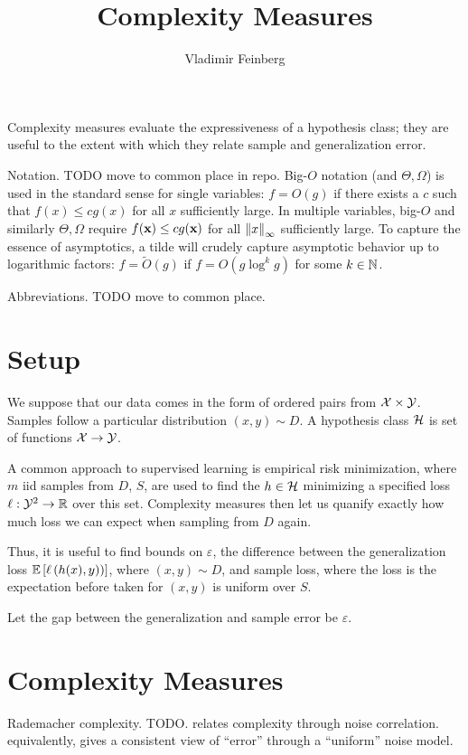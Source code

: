 \documentclass{article}
\title{Complexity Measures}
\author{Vladimir Feinberg}
\begin{document}
\maketitle

Complexity measures evaluate the expressiveness of a hypothesis class; they are useful to the extent with which they relate sample and generalization error.

Notation. TODO move to common place in repo. Big-$O$ notation (and $\Theta,\Omega$) is used in the standard sense for single variables: $f=O(g)$ if there exists a $c$ such that $f(x)\le cg(x)$ for all $x$ sufficiently large. In multiple variables, big-$O$ and similarly $\Theta,\Omega$ require $f(\textbf{x})\le cg(\textbf{x})$ for all $\left\| x \right\|_\infty$ sufficiently large. To capture the essence of asymptotics, a tilde will crudely capture asymptotic behavior up to logarithmic factors: $f=\tilde{O}(g)$ if $f=O(g\log^k g)$ for some $k\in\mathbb{N}$.

Abbreviations. TODO move to common place.

\section{Setup}

We suppose that our data comes in the form of ordered pairs from $\mathcal{X}\times \mathcal{Y}$. Samples follow a particular distribution $(x, y)\sim D$. A hypothesis class ${\mathcal{H}}$ is set of functions $\mathcal{X}\rightarrow\mathcal{Y}$.

A common approach to supervised learning is empirical risk minimization, where $m$ iid samples from $D$, $S$, are used to find the $h\in{\mathcal{H}}$ minimizing a specified loss $\ell:\mathcal{Y}^2\rightarrow\mathbb{R}$ over this set. Complexity measures then let us quanify exactly how much loss we can expect when sampling from $D$ again.

Thus, it is useful to find bounds on $\varepsilon$, the difference between the generalization loss $\operatorname{\mathbb{E}}\left[\ell\left({h(x), y)}\right)\right]$, where $(x,y)\sim D$, and sample loss, where the loss is the expectation before taken for $(x,y)$ is uniform over $S$.

Let the gap between the generalization and sample error be $\varepsilon$.

\section{Complexity Measures}

Rademacher complexity. TODO. relates complexity through noise correlation. equivalently, gives a consistent view of ``error'' through a ``uniform'' noise model.
\end{document}
